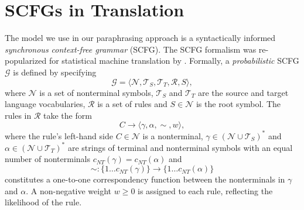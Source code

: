 \documentclass[11pt]{article}
\newcommand{\mnote}[1]{\marginpar{%
  \vskip-\baselineskip
  \raggedright\footnotesize
  \itshape\hrule\smallskip\footnotesize{#1}\par\smallskip\hrule}}
\begin{document}


\section{SCFGs in Translation} \label{formalism}

The model we use in our paraphrasing approach is a syntactically
informed \emph{ synchronous context-free grammar} (SCFG).  The SCFG formalism \cite{Aho1972}  was re-popularized for statistical machine translation by .  
Formally, a \emph{probabilistic} SCFG $\mathcal{G}$ is defined by
specifying
\[
\mathcal{G} = \langle \mathcal{N}, \mathcal{T}_S, \mathcal{T}_T,
\mathcal{R}, S \rangle ,
\]
where $\mathcal{N}$ is a set of nonterminal symbols, $\mathcal{T}_S$
and $\mathcal{T}_T$ are the source and target language vocabularies,
$\mathcal{R}$ is a set of rules and $S \in \mathcal{N}$ is the root
symbol. The rules in $\mathcal{R}$ take the form
\begin{equation*}
  C \rightarrow \langle \gamma, \alpha, \sim, w \rangle ,
\end{equation*}
where the rule's left-hand side $C \in \mathcal{N}$ is a nonterminal,
$\gamma \in (\mathcal{N} \cup \mathcal{T}_S)^*$ and $\alpha \in
(\mathcal{N} \cup \mathcal{T}_T)^*$ are strings of terminal and
nonterminal symbols with an equal number of nonterminals
$c_{\mathit{NT}}(\gamma) = c_{\mathit{NT}}(\alpha)$ and 
$$
\sim : \{1 \ldots c_{\mathit{NT}}(\gamma)\} \rightarrow \{1 \ldots
c_{\mathit{NT}}(\alpha)\}
$$ 
constitutes a one-to-one correspondency function between the
nonterminals in $\gamma$ and $\alpha$. A non-negative weight $w \geq
0$ is assigned to each rule, reflecting the likelihood of the rule.
\end{document}
